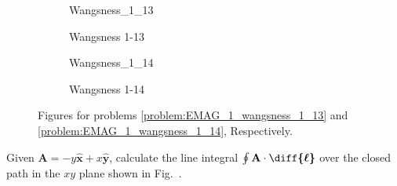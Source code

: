 \documentclass[crop=false,class=article,oneside]{standalone}
\begin{document}
        \begin{figure}[H]
            \centering
            \captionsetup{type=figure}
            \begin{subfigure}[b]{0.49\textwidth}
                \centering
                \captionsetup{type=figure}
                {Wangsness_1_13}
            \caption{Wangsness 1-13}
            \label{fig:EMAG_1_wangsness_1_13_region_of_integration}
            \end{subfigure}
            \begin{subfigure}[b]{0.49\textwidth}
                \centering
                \captionsetup{type=figure}
                {Wangsness_1_14}
                \caption{Wangsness 1-14}
                \label{fig:EMAG_1_wangsness_1_14}
            \end{subfigure}
            \caption[Figures for Wangsness 1-13 and 1-14]
            {Figures for problems
            \ref{problem:EMAG_1_wangsness_1_13} and
            \ref{problem:EMAG_1_wangsness_1_14}, Respectively.}
        \end{figure}
        \begin{problem}[Wangsness 1-14]
            \label{problem:EMAG_1_wangsness_1_14}
            Given $\mathbf{A}=-y\hat{\mathbf{x}}+x\hat{\mathbf{y}}$,
            calculate the line integral
            $\oint\mathbf{A}\cdot\boldsymbol{\diff{\ell}}$
            over the closed path in the $xy$
            plane shown in
            Fig.~.
        \end{problem}
\end{document}
